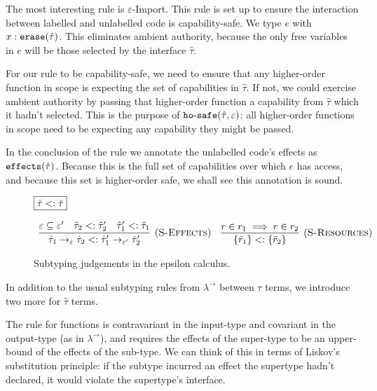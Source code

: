 \noindent
The most interesting rule is $\varepsilon$-Import. This rule is set up to ensure the interaction between labelled and unlabelled code is capability-safe. We type $e$ with $x: \mathtt{erase}(\hat \tau)$. This eliminates ambient authority, because the only free variables in $e$ will be those selected by the interface $\hat \tau$.

For our rule to be capability-safe, we need to ensure that any higher-order function in scope is expecting the set of capabilities in $\hat \tau$. If not, we could exercise ambient authority by passing that higher-order function a capability from $\hat \tau$ which it hadn't selected. This is the purpose of $\mathtt{ho \hbox{-} safe}(\hat \tau, \varepsilon)$: all higher-order functions in scope need to be expecting any capability they might be passed.

In the conclusion of the rule we annotate the unlabelled code's effects as $\mathtt{effects}(\hat \tau)$. Because this is the full set of capabilities over which $e$ has access, and because this set is higher-order safe, we shall see this annotation is sound.



\begin{figure}[h]
\noindent
$\fbox{$\hat \tau <: \hat \tau$}$

\[
\begin{array}{c}

\infer[(\textsc{S-Effects})]
	{\hat \tau_1 \rightarrow_{\varepsilon} \hat \tau_2 <: \hat \tau_1' \rightarrow_{\varepsilon'} \hat \tau_2'}
	{\varepsilon \subseteq \varepsilon' & \hat \tau_2 <: \hat \tau_2' & \hat \tau_1' <: \hat \tau_1}
~~~
\infer[(\textsc{S-Resources})]
	{ \{ \bar r_1 \} <: \{ \bar r_2 \} }
	{ r \in r_1 \implies r \in r_2 }

\end{array}
\]
\vspace{-7pt}
\caption{Subtyping judgements in the epsilon calculus.}
\label{This is the label.}
\end{figure}

\noindent
In addition to the usual subtyping rules from $\lambda^{\rightarrow}$ between $\tau$ terms, we introduce two more for $\hat \tau$ terms. 

The rule for functions is contravariant in the input-type and covariant in the output-type (as in $\lambda^{\rightarrow}$), and requires the effects of the super-type to be an upper-bound of the effects of the sub-type. We can think of this in terms of Liskov's substitution principle: if the subtype incurred an effect the supertype hadn't declared, it would violate the supertype's interface.

